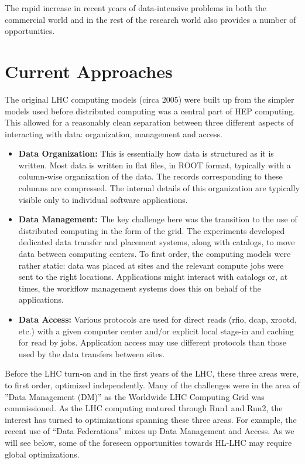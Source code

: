 \documentclass[12pt,a4paper]{article}
\begin{document}
The rapid increase in recent years of data-intensive problems in both
the commercial world and in the rest of the research world also provides
a number of opportunities.

\section{Current Approaches}\label{current-approaches}

The original LHC computing models (circa 2005) were built up from the
simpler models used before distributed computing was a central part of
HEP computing. This allowed for a reasonably clean separation between
three different aspects of interacting with data: organization,
management and access.

\begin{itemize}
\item \textbf{Data Organization:} This is essentially how data is structured
  as it is written. Most data is written in flat files, in ROOT format,
  typically with a column-wise organization of the data. The records
  corresponding to these columns are compressed. The internal details of
  this organization are typically visible only to individual software
  applications.
\item \textbf{Data Management:} The key challenge here was the transition to
  the use of distributed computing in the form of the grid. The
  experiments developed dedicated data transfer and placement systems,
  along with catalogs, to move data between computing centers. To first
  order, the computing models were rather static: data was placed at
  sites and the relevant compute jobs were sent to the right locations.
  Applications might interact with catalogs or, at times, the workflow
  management systems does this on behalf of the applications.
\item \textbf{Data Access:} Various protocols are used for direct reads
  (rfio, dcap, xrootd, etc.) with a given computer center and/or
  explicit local stage-in and caching for read by jobs. Application
  access may use different protocols than those used by the data
  transfers between sites.
\end{itemize}

Before the LHC turn-on and in the first years of the LHC, these three
areas were, to first order, optimized independently. Many of the
challenges were in the area of ''Data Management (DM)'' as the Worldwide
LHC Computing Grid was commissioned. As the LHC computing matured
through Run1 and Run2, the interest has turned to optimizations spanning
these three areas. For example, the recent use of ``Data Federations''
mixes up Data Management and Access. As we will see below, some of the
foreseen opportunities towards HL-LHC may require global optimizations.
\end{document}
